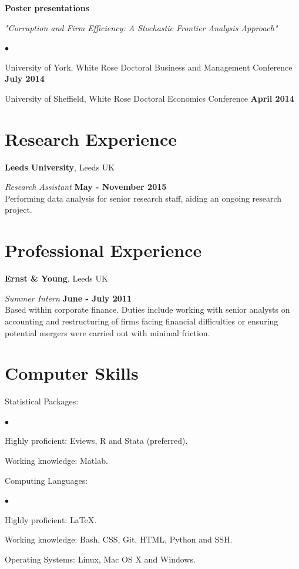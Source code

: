 \documentclass[margin,line,9pt]{res}
\newenvironment{list1}{
  \begin{list}{\ding{113}}{%
      \setlength{\itemsep}{0in}
      \setlength{\parsep}{0in} \setlength{\parskip}{0in}
      \setlength{\topsep}{0in} \setlength{\partopsep}{0in}
      \setlength{\leftmargin}{0.17in}}}{\end{list}}
\newenvironment{list2}{
  \begin{list}{$\bullet$}{%
      \setlength{\itemsep}{0in}
      \setlength{\parsep}{0in} \setlength{\parskip}{0in}
      \setlength{\topsep}{0in} \setlength{\partopsep}{0in}
      \setlength{\leftmargin}{0.2in}}}{\end{list}}
\begin{document}
\begin{resume}
\vspace*{.05in}
\textbf{Poster presentations}\\
\begin{list1}
\item[] \textit{"Corruption and Firm Efficiency: A Stochastic Frontier Analysis Approach"}
\vspace*{.1in}
\begin{list2}
\item University of York, White Rose Doctoral Business and Management Conference \hfill \textbf{July 2014}
\item University of Sheffield, White Rose Doctoral Economics Conference \hfill \textbf{April 2014}
\end{list2}
\end{list1}


\section{\sc Research Experience}
{\bf Leeds University}, Leeds UK

{\em Research Assistant} \hfill {\bf May - November 2015}\\
Performing data analysis for senior research staff, aiding an ongoing research project.

\section{\sc Professional Experience}
{\bf Ernst \& Young}, Leeds UK

\vspace{-.3cm}
{\em Summer Intern} \hfill {\bf June - July 2011}\\
Based within corporate finance. Duties include working with senior analysts on accounting and restructuring of firms facing financial difficulties or ensuring potential mergers were carried out with minimal friction.

\section{\sc Computer Skills}
\begin{list1}
\item[] Statistical Packages:
	\begin{list2}
		\item Highly proficient: Eviews, R and Stata (preferred).
		\item Working knowledge: Matlab.
	\end{list2}
	\smallskip
\item[] Computing Languages:
	\begin{list2}
		\item Highly proficient: \LaTeX.
		\item Working knowledge: Bash, CSS, Git, HTML, Python and SSH.
	\end{list2}
	\smallskip
\item[] Operating Systems:  Linux, Mac OS X and Windows.\\
\end{list1}

\end{resume}
\end{document}
